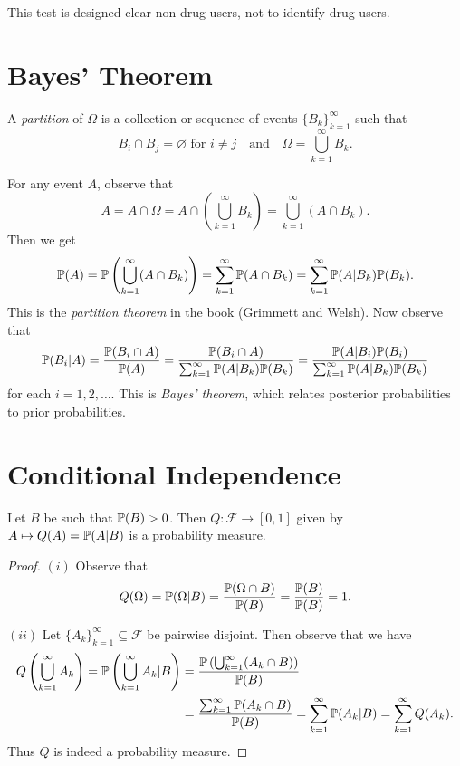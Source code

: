 \begin{remark}
  This test is designed clear non-drug users, not
  to identify drug users.
\end{remark}

\section{Bayes' Theorem}
\begin{definition}
  A \emph{partition} of $\Omega$ is a collection
  or sequence of events $\{B_k\}_{k = 1}^\infty$
  such that
  \[
    B_i \cap B_j = \varnothing
    \text{ for } i \ne j \quad \text{and} \quad
    \Omega = \bigcup_{k = 1}^\infty B_k.
  \]
\end{definition}

\begin{remark}
  For any event $A$, observe that
  \[
    A = A \cap \Omega
    = A \cap \left(\bigcup_{k = 1}^\infty B_k\right)
    = \bigcup_{k = 1}^\infty (A \cap B_k).
  \]
  Then we get
  \[
    \mathbb{P}(A) = \mathbb{P}\left(\bigcup_{k = 1}^\infty (A \cap B_k)\right)
    = \sum_{k = 1}^\infty \mathbb{P}(A \cap B_k)
    = \sum_{k = 1}^\infty \mathbb{P}(A | B_k) \mathbb{P}(B_k).
  \]
  This is the \emph{partition theorem} in the book (Grimmett and Welsh).
  Now observe that
  \[
    \mathbb{P}(B_i | A) = \frac{\mathbb{P}(B_i \cap A)}{\mathbb{P}(A)}
    = \frac{\mathbb{P}(B_i \cap A)}{\sum_{k = 1}^\infty \mathbb{P}(A| B_k)\mathbb{P}(B_k)}
    = \frac{\mathbb{P}(A | B_i) \mathbb{P}(B_i)}{\sum_{k = 1}^\infty \mathbb{P}(A| B_k)\mathbb{P}(B_k)}
  \]
  for each $i = 1, 2, \dots$.
  This is \emph{Bayes' theorem}, which relates
  posterior probabilities to prior probabilities.
\end{remark}

\section{Conditional Independence}
\begin{prop}
  Let $B$ be such that $\mathbb{P}(B) > 0$. Then
  $Q : \mathcal{F} \to [0, 1]$ given by
  $A \mapsto Q(A) = \mathbb{P}(A | B)$ is a probability
  measure.
\end{prop}

\begin{proof}
  $(i)$ Observe that
  \[
    Q(\Omega) = \mathbb{P}(\Omega | B)
    = \frac{\mathbb{P}(\Omega \cap B)}{\mathbb{P}(B)}
    = \frac{\mathbb{P}(B)}{\mathbb{P}(B)} = 1.
  \]

  $(ii)$ Let $\{A_k\}_{k = 1}^\infty \subseteq \mathcal{F}$
  be pairwise disjoint. Then observe that
  we have
  \begin{align*}
    Q\left(\bigcup_{k = 1}^\infty A_k\right)
    = \mathbb{P}\left(\bigcup_{k = 1}^\infty A_k | B\right)
    &= \frac{\mathbb{P}\left(\bigcup_{k = 1}^\infty (A_k \cap B)\right)}{\mathbb{P}(B)} \\
    &= \frac{\sum_{k = 1}^\infty \mathbb{P}(A_k \cap B)}{\mathbb{P}(B)}
    = \sum_{k = 1}^\infty \mathbb{P}(A_k | B)
    = \sum_{k = 1}^\infty Q(A_k).
  \end{align*}
  Thus $Q$ is indeed a probability measure.
\end{proof}

